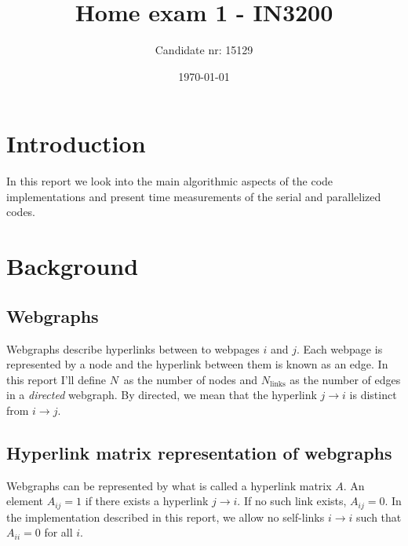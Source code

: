 \documentclass[english,notitlepage, reprint]{revtex4-1}  %
\begin{document}
\title{Home exam 1 - IN3200}      %
\author{Candidate nr: 15129}          %
\date{\today}                             %
\noaffiliation                            %

\maketitle
\section{Introduction}
In this report we look into the main algorithmic aspects of the code implementations and present time measurements of the serial and parallelized codes.
\section{Background}

\subsection*{Webgraphs}
Webgraphs describe hyperlinks between to webpages $i$ and $j$. Each webpage is represented by a node and the hyperlink between them is known as an edge. In this report I'll define $N$ as the number of nodes and $N_\text{links}$ as the number of edges in a \textit{directed }webgraph. By directed, we mean that the hyperlink $j\to i$ is distinct from $i \to j$.

\subsection*{Hyperlink matrix representation of webgraphs}
Webgraphs can be represented by what is called a hyperlink matrix $A$. An element $A_{ij} = 1$ if there exists a hyperlink $j \to i$. If no such link exists, $A_{ij} = 0$. In the implementation described in this report, we allow no self-links $i \to i$ such that $A_{ii} = 0$ for all $i$.
\end{document}

